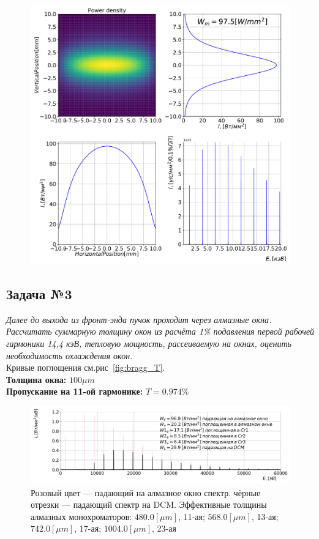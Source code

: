 \documentclass[14pt,a4paper]{extarticle}
\numberwithin{equation}{section}
\begin{document}
\begin{figure}[htbp]
\begin{minipage}{1.\textwidth}
		\includegraphics[width=\textwidth]{pic/power_dens.pdf}
		\caption{}
		\label{fig:spec}
\end{minipage}     
\end{figure}

\subsection{Задача №3}
\textit{Далее до выхода из фронт-энда пучок проходит через алмазные окна. Рассчитать суммарную толщину окон из расчёта 1\% подавления первой рабочей гармоники 14,4 кэВ, тепловую мощность, рассеиваемую на окнах, оценить необходимость охлаждения окон.}\\
Кривые поглощения см.рис~\ref{fig:bragg_T}.\\
\textbf{Толщина окна:} $100\mu m$\\
\textbf{Пропускание на 11-ой гармонике:} $T = 0.974 \%$\\
\begin{figure}[htbp]
	\centering  
	\includegraphics[width=\textwidth]{pic/spec.pdf}
	\caption{Розовый цвет --- падающий на алмазное окно спектр. 
		чёрные отрезки --- падающий спектр на DCM. Эффективные толщины алмазных монохроматоров: $480.0 [\mu m]$, 11-ая; $568.0 [\mu m]$, 13-ая; $742.0 [\mu m]$, 17-ая; $1004.0 [\mu m]$, 23-ая}
	\label{fig:absorb_spec}
	
\end{figure}
\end{document}
